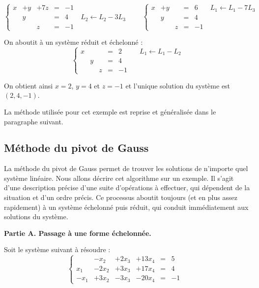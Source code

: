 \documentclass[class=report,crop=false]{standalone}
\begin{document}
\begin{exemple}
\[ \left\{
\begin{array}{cccccr}
x  & + y & +7z & = & -1 & \\
   &  y  &     & = & 4  & {\scriptstyle \  L_2 \leftarrow L_2-3L_3}\\
   &     &  z  & = & -1 &
\end{array} \right.
\qquad
\left\{
\begin{array}{cccccr}
x  & + y &     & = & 6 & {\scriptstyle \  L_1 \leftarrow L_1 -7L_3}\\
   &  y  &     & = & 4 & \\
   &     & z   & = & -1 &
\end{array} \right.
\]

On aboutit à un système réduit et échelonné :
\[\left\{
\begin{array}{cccccr}
x  &   &      & = & 2 & {\scriptstyle \quad L_1 \leftarrow L_1 -L_2}\\
   &  y  &    & = & 4 & \\
   &     & z  & = & -1 &
\end{array} \right.
\]

On obtient ainsi $x=2$, $y=4$ et $z=-1$ et
l'unique solution du système est $(2,4,-1)$.
\end{exemple}

La méthode utilisée pour cet exemple est reprise et généralisée dans le paragraphe suivant.

\subsection{Méthode du pivot de Gauss}

La méthode du pivot de Gauss permet de trouver les solutions de n'importe
quel système linéaire.
Nous allons décrire cet algorithme sur un exemple.
Il s'agit d'une description précise d'une suite d'opérations à effectuer,
qui dépendent de la situation et d'un ordre précis. Ce processus
aboutit toujours (et en plus assez rapidement)
à un système échelonné puis réduit, qui conduit immédiatement aux solutions du système.


\textbf{Partie A. Passage à une forme échelonnée.}

Soit le système suivant à résoudre :
 \[\left\{\begin{array}{ccccccr}
 & -x_2 &+2x_3& +13x_4 &=& 5  & \\
x_1 &-2x_2&+3x_3& +17x_4 &=& 4 & \\
-x_1& +3x_2    &-3x_3  & -20x_4  &=& -1 &
\end{array} \right.\]
\end{document}
